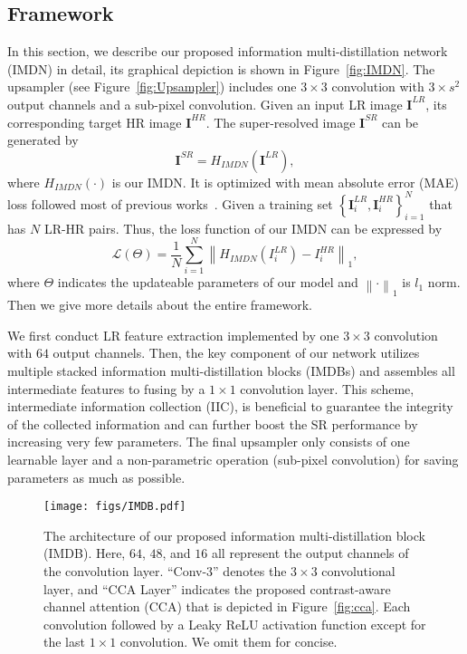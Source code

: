 \documentclass[sigconf]{acmart}
\begin{document}
\subsection{Framework}
In this section, we describe our proposed information multi-distillation network (IMDN) in detail, its graphical depiction is shown in Figure~\ref{fig:IMDN}. The upsampler (see Figure~\ref{fig:Upsampler}) includes one $3 \times 3$ convolution with $3 \times {s^2}$ output channels and a sub-pixel convolution. Given an input LR image ${\mathbf{I}^{LR}}$, its corresponding target HR image ${\mathbf{I}^{HR}}$. The super-resolved image ${\mathbf{I}^{SR}}$ can be generated by
\begin{equation}
{\mathbf{I}^{SR}} = {H_{IMDN}}\left( {{\mathbf{I}^{LR}}} \right),
\end{equation}
where ${H_{IMDN}}\left(  \cdot  \right)$ is our IMDN. It is optimized with mean absolute error (MAE) loss followed most of previous works~\cite{EDSR,IDN,RDN,RCAN,CARN}. Given a training set $\left\{ {\mathbf{I}_i^{LR},\mathbf{I}_i^{HR}} \right\}_{i = 1}^N$ that has $N$ LR-HR pairs. Thus, the loss function of our IMDN can be expressed by
\begin{equation}
{\mathcal L}\left( \Theta  \right) = \frac{1}{N}\sum\limits_{i = 1}^N {{{\left\| {{H_{IMDN}}\left( {I_i^{LR}} \right) - I_i^{HR}} \right\|}_1}} ,
\end{equation}
where $\Theta$ indicates the updateable parameters of our model and ${{{\left\|  \cdot  \right\|}_1}}$ is ${l_1}$ norm. Then we give more details about the entire framework.

We first conduct LR feature extraction implemented by one $3 \times 3$ convolution with $64$ output channels. Then, the key component of our network utilizes multiple stacked information multi-distillation blocks (IMDBs) and assembles all intermediate features to fusing by a $1 \times 1$ convolution layer. This scheme,  intermediate information collection (IIC), is beneficial to guarantee the integrity of the collected information and can further boost the SR performance by increasing very few parameters. The final upsampler only consists of one learnable layer and a non-parametric operation (sub-pixel convolution) for saving parameters as much as possible.


\begin{figure}[htpb]
	\centering
	\texttt{[image: figs/IMDB.pdf]}
	\vspace{-3mm}
	\caption{The architecture of our proposed information multi-distillation block (IMDB). Here, $64$, $48$, and $16$ all represent the output channels of the convolution layer. ``Conv-3'' denotes the $3 \times 3$ convolutional layer, and ``CCA Layer'' indicates the proposed contrast-aware channel attention (CCA) that is depicted in Figure~\ref{fig:cca}. Each convolution followed by a Leaky ReLU activation function except for the last $1 \times 1$ convolution. We omit them for concise.}
	\label{fig:IMDB}
\end{figure}
\end{document}
